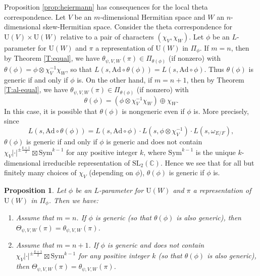 \documentclass[11pt]{amsart}
\numberwithin{equation}{section}
\theoremstyle{plain}
\newtheorem{prop}[thm]{Proposition}
\theoremstyle{definition}
\theoremstyle{remark}
\def\Ad{\mathrm{Ad}}
\def\SL{\mathrm{SL}}
\def\U{\mathrm{U}}
\def\CC{\mathbb{C}}
\begin{document}
Proposition \ref{prop:heiermann} has consequences for the local theta correspondence.
Let $V$ be an $m$-dimensional Hermitian space and $W$ an $n$-dimensional skew-Hermitian space.
Consider the theta correspondence for $\U(V) \times \U(W)$ relative to a pair of characters $(\chi_V, \chi_W)$.
Let $\phi$ be an $L$-parameter for $\U(W)$ and $\pi$ a representation of $\U(W)$ in $\Pi_\phi$.
If $m = n$, then by Theorem \ref{T:equal}, we have $\theta_{\psi,V,W}(\pi) \in \Pi_{\theta(\phi)}$ (if nonzero) with $\theta(\phi)  = \phi  \otimes \chi_V^{-1} \chi_W$, so that $L(s, \Ad \circ \theta(\phi)) =  L(s, \Ad \circ \phi)$.
Thus $\theta(\phi)$ is generic if and only if $\phi$ is.
On the other hand, if $m=n+1$, then by Theorem \ref{T:al-equal}, we have $\theta_{\psi,V,W}(\pi) \in \Pi_{\theta(\phi)}$ (if nonzero) with
\[  \theta(\phi)  = (\phi \otimes \chi_V^{-1} \chi_W) \oplus \chi_W. \]
In this case, it is possible that $\theta(\phi)$ is nongeneric even if $\phi$ is. 
More precisely, since
\[  L(s, \Ad \circ \theta(\phi)) =  L(s, \Ad \circ \phi)  \cdot  L(s,  \phi \otimes \chi_V^{-1}) \cdot L(s, \omega_{E/F}), \] 
$\theta(\phi)$ is generic if and only if $\phi$ is generic and does not contain $\chi_V |\cdot|^{\pm \frac{k+1}{2}} \boxtimes \mathrm{Sym}^{k-1}$ for any positive integer $k$, where $\mathrm{Sym}^{k-1}$ is the unique $k$-dimensional irreducible representation of $\SL_2(\CC)$.
Hence we see that for all but finitely many choices of $\chi_V$ (depending on $\phi$), $\theta(\phi)$ is generic if $\phi$ is.

\begin{prop}
\label{P:generic-theta}
Let $\phi$ be an $L$-parameter for $\U(W)$ and $\pi$ a representation of $\U(W)$ in $\Pi_\phi$.
Then we have:
\begin{enumerate}
\item Assume that $m=n$.
If $\phi$ is generic (so that $\theta(\phi)$ is also generic), then $\Theta_{\psi,V,W}(\pi) = \theta_{\psi,V,W}(\pi)$.
\item Assume that $m=n+1$.
If $\phi$ is generic and does not contain $\chi_V |\cdot|^{\pm \frac{k+1}{2}} \boxtimes \mathrm{Sym}^{k-1}$ for any positive integer $k$ (so that $\theta(\phi)$ is also generic), then $\Theta_{\psi,V,W}(\pi) = \theta_{\psi,V,W}(\pi)$.
\end{enumerate}
\end{prop}
\end{document}
